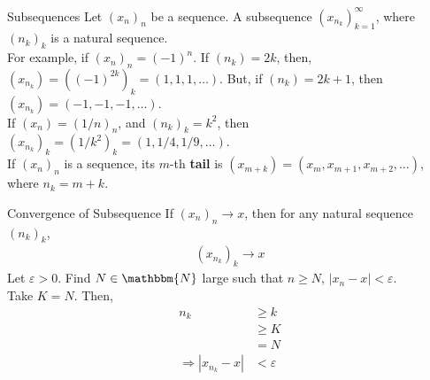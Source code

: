 \documentclass[10pt]{extarticle}
\newcommand{\N}{\mathbbm{N}}
\begin{document}
  \begin{problem}{Subsequences}
    Let $(x_n)_n$ be a sequence. A subsequence $(x_{n_k})_{k=1}^{\infty}$, where $(n_k)_{k}$ is a natural sequence.\\

    For example, if $(x_n)_n = (-1)^n$. If $(n_k) = 2k$, then, $(x_{n_k}) = \left((-1)^{2k}\right)_k = (1,1,1,\dots)$. But, if $(n_k) = 2k+1$, then $(x_{n_k}) = (-1,-1,-1,\dots)$.\\

    If $(x_n) = (1/n)_n$, and $(n_k)_k = k^2$, then $(x_{n_k})_{k} = (1/k^2)_{k} = (1,1/4,1/9,\dots)$.\\

    If $(x_n)_n$ is a sequence, its $m$-th \textbf{tail} is $(x_{m+k}) = (x_m,x_{m+1},x_{m+2},\dots)$, where $n_k = m+k$.
  \end{problem}
  \begin{problem}{Convergence of Subsequence}
    If $(x_n)_n \rightarrow x$, then for any natural sequence $(n_k)_k$,
    \begin{align*}
      \left(x_{n_k}\right)_k \rightarrow x
    \end{align*}
    \tcblower
    Let $\varepsilon > 0$. Find $N\in\N$ large such that $n \geq N$, $|x_{n} - x| < \varepsilon$.\\

    Take $K = N$. Then,
    \begin{align*}
      n_k &\geq k\\
      &\geq K\\
      &= N\\
      \Rightarrow |x_{n_k} - x| &< \varepsilon
    \end{align*}
  \end{problem}
\end{document}
